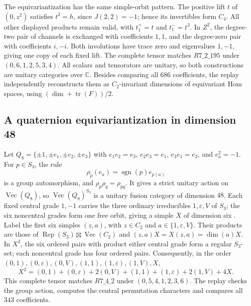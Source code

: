 \documentclass[11pt]{article}
\newcommand{\C}{\mathbb C}
\begin{document}
The equivariantization has the same simple-orbit pattern. The positive
lift $t$ of $(0,z^2)$ satisfies $t^2=h$, since $J(2,2)=-1$; hence its
invertibles form $C_4$. All other displayed products remain valid, with
$t_1^+=t$ and $t_1^-=t^3$. In $Z^2$, the degree-two pair of channels is
exchanged with coefficients $1,1$, and the degree-zero pair with
coefficients $i,-i$. Both involutions have trace zero and eigenvalues
$1,-1$, giving one copy of each fixed lift. The complete tensor matches
$R7\_2\_195$ under $(0,6,1,2,5,3,4)$. All scalars and tensorators are
unitary, so both constructions are unitary categories over $\C$.
Besides comparing all $686$ coefficients, the replay independently
reconstructs them as $C_2$-invariant dimensions of equivariant Hom
spaces, using $(\dim+\operatorname{tr}(F))/2$.

\subsection{A quaternion equivariantization in dimension 48}
Let $Q_8=\{\pm1,\pm e_1,\pm e_2,\pm e_3\}$ with
$e_1e_2=e_3$, $e_2e_3=e_1$, $e_3e_1=e_2$, and $e_a^2=-1$.
For $p\in S_3$, the rule
\[
 \rho_p(e_a)=\operatorname{sgn}(p)e_{p(a)}
\]
is a group automorphism, and $\rho_p\rho_q=\rho_{pq}$.
It gives a strict unitary action on $\operatorname{Vec}(Q_8)$, so
$\operatorname{Vec}(Q_8)^{S_3}$ is a unitary fusion category of
dimension $48$. Each fixed central grade $1,-1$ carries the three
ordinary irreducibles $1,\varepsilon,V$ of $S_3$; the six noncentral
grades form one free orbit, giving a simple $X$ of dimension six
\cite{BurciuNatale}. Label the first six simples $(z,a)$, with
$z\in C_2$ and $a\in\{1,\varepsilon,V\}$. Their products are those
of $\operatorname{Rep}(S_3)\boxtimes\operatorname{Vec}(C_2)$ and
$(z,a)X=X(z,a)=\dim(a)X$.
In $X^2$, the six ordered pairs with product either central grade
form a regular $S_3$-set; each noncentral grade has four ordered pairs.
Consequently, in the order
$(0,1),(0,\varepsilon),(0,V),(1,1),(1,\varepsilon),(1,V),X$,
\[
 X^2=(0,1)+(0,\varepsilon)+2(0,V)
       +(1,1)+(1,\varepsilon)+2(1,V)+4X.
\]
This complete tensor matches $R7\_4\_2$ under
$(0,5,4,1,2,3,6)$. The replay checks the group action, computes the
central permutation characters and compares all $343$ coefficients.
\end{document}
